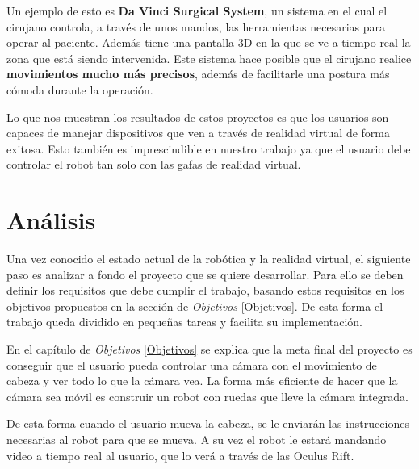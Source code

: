 \documentclass[twoside, 11pt]{epstfg}
\begin{document}
Un ejemplo de esto es \textbf{Da Vinci Surgical System}, un sistema en el cual el cirujano controla, a través de unos mandos, las herramientas necesarias para operar al paciente. Además tiene una pantalla 3D en la que se ve a tiempo real la zona que está siendo intervenida.
Este sistema hace posible que el cirujano realice \textbf{movimientos mucho más precisos}, además de facilitarle una postura más cómoda durante la operación. \cite{Hubens2003}

Lo que nos muestran los resultados de estos proyectos es que los usuarios son capaces de manejar dispositivos que ven a través de realidad virtual de forma exitosa. Esto también es imprescindible en nuestro trabajo ya que el usuario debe controlar el robot tan solo con las gafas de realidad virtual. 




\chapter{Análisis}
\label{chap:sistemadesarrollado}
Una vez conocido el estado actual de la robótica y la realidad virtual, el siguiente paso es analizar a fondo el proyecto que se quiere desarrollar.
Para ello se deben definir los requisitos que debe cumplir el trabajo, basando estos requisitos en los objetivos propuestos en la sección de \textit{Objetivos} \ref{Objetivos}. De esta forma el trabajo queda dividido en pequeñas tareas y facilita su implementación.

En el capítulo de \textit{Objetivos} \ref{Objetivos} se explica que la meta final del proyecto es conseguir que el usuario pueda controlar una cámara con el movimiento de cabeza y ver todo lo que la cámara vea.
La forma más eficiente de hacer que la cámara sea móvil es construir un robot con ruedas que lleve la cámara integrada. 

De esta forma cuando el usuario mueva la cabeza, se le enviarán las instrucciones necesarias al robot para que se mueva. A su vez el robot le estará mandando video a tiempo real al usuario, que lo verá a través de las Oculus Rift.
\end{document}
